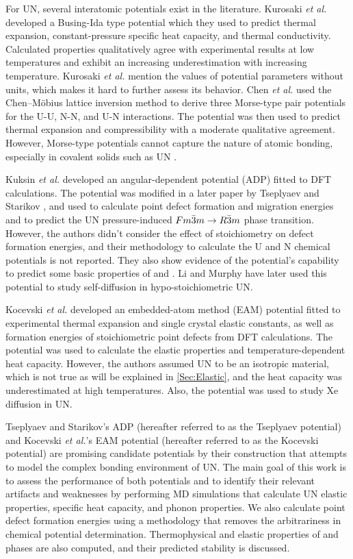 \documentclass[preprint, 12pt]{elsarticle}
\begin{document}
For UN, several interatomic potentials exist in the literature. Kurosaki \textit{et al.} \cite{Kurosaki2000I, Kurosaki2000II} developed a Busing-Ida type potential which they used to predict thermal expansion, constant-pressure specific heat capacity, and thermal conductivity. Calculated properties qualitatively agree with experimental results at low temperatures and exhibit an increasing underestimation with increasing temperature. Kurosaki \textit{et al.} mention the values of potential parameters without units, which makes it hard to further assess its behavior. Chen \textit{et al.} \cite{Chen2010} used the Chen–Möbius lattice inversion method to derive three Morse-type pair potentials for the U-U, N-N, and U-N interactions. The potential was then used to predict thermal expansion and compressibility with a moderate qualitative agreement. However, Morse-type potentials cannot capture the nature of atomic bonding, especially in covalent solids such as UN \cite{Mishin2005}.

Kuksin \textit{et al.} \cite{Kuksin2016} developed an angular-dependent potential (ADP) fitted to DFT calculations. The potential was modified in a later paper by Tseplyaev and Starikov \cite{Tseplyaev2016}, and used to calculate point defect formation and migration energies and to predict the UN pressure-induced $Fm\Bar{3}m \rightarrow R\Bar{3}m$ phase transition. However, the authors didn't consider the effect of stoichiometry on defect formation energies, and their methodology to calculate the U and N chemical potentials is not reported. They also show evidence of the potential's capability to predict some basic properties of  and . Li and Murphy \cite{Li2021} have later used this potential to study self-diffusion in hypo-stoichiometric UN.

Kocevski \textit{et al.} \cite{Kocevski2022II} developed an embedded-atom method (EAM) potential fitted to experimental thermal expansion and single crystal elastic constants, as well as formation energies of stoichiometric point defects from DFT calculations. The potential was used to calculate the elastic properties and temperature-dependent heat capacity. However, the authors assumed UN to be an isotropic material, which is not true as will be explained in \ref{Sec:Elastic}, and the heat capacity was underestimated at high temperatures. Also, the potential was used to study Xe diffusion in UN.

Tseplyaev and Starikov's ADP (hereafter referred to as the Tseplyaev potential) and Kocevski \textit{et al.}'s EAM potential (hereafter referred to as the Kocevski potential) are promising candidate potentials by their construction that attempts to model the complex bonding environment of UN. The main goal of this work is to assess the performance of both potentials and to identify their relevant artifacts and weaknesses by performing MD simulations that calculate UN elastic properties, specific heat capacity, and phonon properties. We also calculate point defect formation energies using a methodology that removes the arbitrariness in chemical potential determination. Thermophysical and elastic properties of  and  phases are also computed, and their predicted stability is discussed. 
\end{document}
